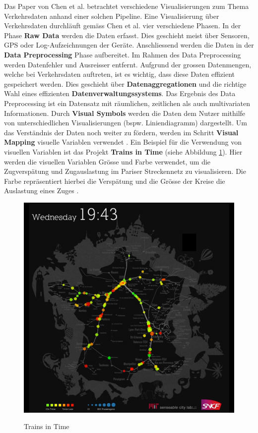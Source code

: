 Das Paper von Chen et al. betrachtet verschiedene Visualisierungen zum Thema Verkehrsdaten anhand einer solchen Pipeline. Eine Visualisierung über Verkehrsdaten durchläuft gemäss Chen et al. vier verschiedene Phasen. In der Phase \textbf{Raw Data} werden die Daten erfasst. Dies geschieht meist über Sensoren, GPS oder Log-Aufzeichnungen der Geräte. Anschliessend werden die Daten in der \textbf{Data Preprocessing} Phase aufbereitet. Im Rahmen des Data Preprocessing werden Datenfehler und Ausreisser entfernt. Aufgrund der grossen Datenmengen, welche bei Verkehrsdaten auftreten, ist es wichtig, dass diese Daten effizient gespeichert werden. Dies geschieht über \textbf{Datenaggregationen} und die richtige Wahl eines effizienten \textbf{Datenverwaltungssystems}. Das Ergebnis des Data Preprocessing ist ein Datensatz mit räumlichen, zeitlichen als auch multivariaten Informationen. Durch \textbf{Visual Symbols} werden die Daten dem Nutzer mithilfe von unterschiedlichen Visualisierungen (bspw. Liniendiagramm) dargestellt. Um das Verständnis der Daten noch weiter zu fördern, werden im Schritt \textbf{Visual Mapping} visuelle Variablen verwendet \parencite[S.2971]{survey_traffic_data_visualization_2015}. Ein Beispiel für die Verwendung von visuellen Variablen ist das Projekt \textbf{Trains in Time} (siehe Abbildung \ref{fig_trains_in_time}). Hier werden die visuellen Variablen Grösse und Farbe verwendet, um die Zugverspätung und Zugauslastung im Pariser Streckennetz zu visualisieren. Die Farbe repräsentiert hierbei die Verspätung und die Grösse der Kreise die Auslastung eines Zuges \parencite{trains_of_data_2012}.   

\begin{figure}[H]
    \caption{Trains in Time \parencite{trains_of_data_2012}}
    \includegraphics[width=.5\linewidth]{content/00_assets/trains_in_time.jpg}
    \label{fig_trains_in_time}
\end{figure}

